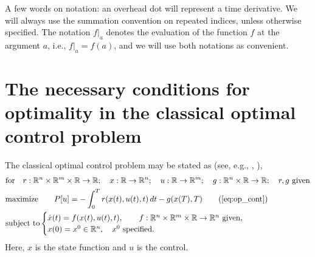 \documentclass[11pt]{article}
\begin{document}
A few words on notation: an overhead dot will represent a time derivative. We will always use the summation convention on repeated indices, unless otherwise specified. The notation $f|_a$ denotes the evaluation of the function $f$ at the argument $a$, i.e., $f|_a = f(a)$, and we will use both notations as convenient.

\section{The necessary conditions for optimality in the classical optimal control problem}\label{sec:gen_form}
The classical optimal control problem may be stated as (see, e.g., \cite{evans1983introduction}, \cite[Sec.~9.5,9.6]{luenberger_optimization}),
\begin{subequations}\label{eq:op_cont}
\allowdisplaybreaks
    \begin{align}
        & \mbox{for} \quad r: \R^n \times \R^m \times \R \to \R; \quad x: \R \to \R^n; \quad u: \R \to \R^m; \quad g:\R^n \times \R \to \R; \quad r,g \ \mbox{given} \notag\\
        & \mbox{maximize} \qquad  P[u]  = - \int_0^T r(x(t), u(t),t) \, dt - g(x(T),T) \tag{\ref{eq:op_cont}}\\
        & \mbox{subject to} \begin{cases}
            \dot{x}(t)  = f(x(t),u(t),t), \qquad f:\R^n \times \R^m \times \R \to \R^n  \ \mbox{given},\\
            x(0) = x^0 \in \R^n, \quad x^0 \ \mbox{specified}.
        \end{cases} \notag
    \end{align}
\end{subequations}
Here, $x$ is the state function and $u$ is the control.
\end{document}

